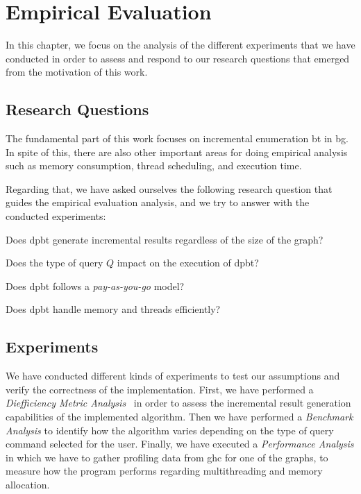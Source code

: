 \chapter{Empirical Evaluation}\label{experiments}
In this chapter, we focus on the analysis of the different experiments that we have conducted
in order to assess and respond to our research questions that emerged from the motivation of this work. 

\section{Research Questions}
The fundamental part of this work focuses on incremental enumeration \acrshort{bt} in \acrshort{bg}. 
In spite of this, there are also other important areas for doing empirical analysis such as memory consumption, thread scheduling, and execution time.

Regarding that, we have asked ourselves the following research question that guides the empirical evaluation analysis, and we try to answer with the conducted experiments:
\begin{inparaenum}[\bf {\bf RQ}1\upshape)]
\label{res:bt:question}
    \item Does \acrshort{dpbt} generate incremental results regardless of the size of the graph?
    \item Does the type of query $Q$ impact on the execution of \acrshort{dpbt}?
    \item Does \acrshort{dpbt} follows a \emph{pay-as-you-go} model?
    \item Does \acrshort{dpbt} handle memory and threads efficiently?
\end{inparaenum}
  
\section{Experiments}
We have conducted different kinds of experiments to test our assumptions and verify the correctness of the implementation.
First, we have performed a \emph{Diefficiency Metric Analysis}~\cite{diefpaper} in order to assess the incremental result generation capabilities of the implemented algorithm. 
Then we have performed a \emph{Benchmark Analysis} to identify how the algorithm varies depending on the type of query command selected for the user.
Finally, we have executed a \textit{Performance Analysis} in which we have to gather profiling data from \acrfull{ghc} for one of the graphs, 
to measure how the program performs regarding multithreading and memory allocation.

